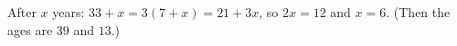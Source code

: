 After $x$ years: $33+x=3(7+x)=21+3x$, so $2x=12$ and $x=\boxed{6}$. (Then the ages are $39$ and $13$.)
